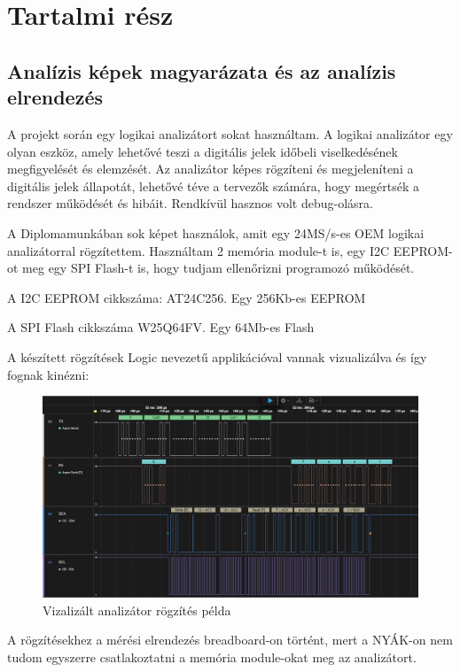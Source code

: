 \documentclass[a4paper,12pt,oneside]{book}
\begin{document}
\chapter{Tartalmi rész}

\section{Analízis képek magyarázata és az analízis elrendezés}
A projekt során egy logikai analizátort sokat használtam. A logikai analizátor egy olyan eszköz, amely lehetővé teszi a digitális jelek időbeli viselkedésének megfigyelését és elemzését. Az analizátor képes rögzíteni és megjeleníteni a digitális jelek állapotát, lehetővé téve a tervezők számára, hogy megértsék a rendszer működését és hibáit. Rendkívül hasznos volt debug-olásra.

A Diplomamunkában sok képet használok, amit egy 24MS/s-es OEM logikai analizátorral rögzítettem. Használtam 2 memória module-t is, egy I2C EEPROM-ot meg egy SPI Flash-t is, hogy tudjam ellenőrizni programozó működését.

A I2C EEPROM cikkszáma: AT24C256. Egy 256Kb-es EEPROM \cite{EEPROM}

A SPI Flash cikkszáma W25Q64FV. Egy 64Mb-es Flash \cite{FLASH}

A készített rögzítések Logic nevezetű applikációval vannak vizualizálva és így fognak kinézni:
\begin{figure}[H]
	\centering
	\includegraphics[trim=1mm 1mm 1mm 1mm,scale=0.3]{i2c small read.PNG}
	\caption{Vizalizált analizátor rögzítés példa}
	\label{Vizalizált analizátor rögzítés példa}
\end{figure}

A rögzítésekhez a mérési elrendezés breadboard-on történt, mert a NYÁK-on nem tudom egyszerre csatlakoztatni a memória module-okat meg az analizátort.
\end{document}
